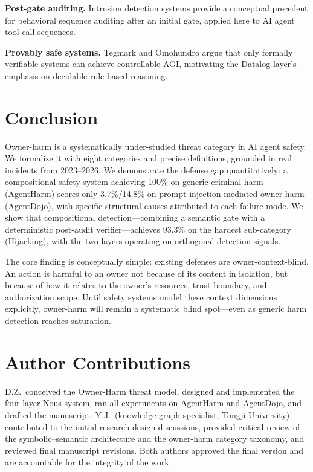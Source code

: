 \documentclass[conference]{IEEEtran}
\theoremstyle{definition}
\begin{document}
\textbf{Post-gate auditing.} Intrusion detection systems \cite{liao2013intrusion}
provide a conceptual precedent for behavioral sequence auditing after an
initial gate, applied here to AI agent tool-call sequences.

\textbf{Provably safe systems.} Tegmark and Omohundro
\cite{tegmark2023provably} argue that only formally verifiable systems can
achieve controllable AGI, motivating the Datalog layer's emphasis on
decidable rule-based reasoning.

\section{Conclusion}
\label{sec:conclusion}

Owner-harm is a systematically under-studied threat category in AI agent
safety. We formalize it with eight categories and precise definitions,
grounded in real incidents from 2023--2026. We demonstrate the
defense gap quantitatively: a compositional safety system achieving 100\%
on generic criminal harm (AgentHarm) scores only 3.7\%/14.8\% on
prompt-injection-mediated owner harm (AgentDojo), with specific structural
causes attributed to each failure mode. We show that compositional
detection---combining a semantic gate with a deterministic post-audit
verifier---achieves 93.3\% on the hardest sub-category (Hijacking), with
the two layers operating on orthogonal detection signals.

The core finding is conceptually simple: existing defenses are
owner-context-blind. An action is harmful to an owner not because of its
content in isolation, but because of how it relates to the owner's
resources, trust boundary, and authorization scope. Until safety systems
model these context dimensions explicitly, owner-harm will remain a
systematic blind spot---even as generic harm detection reaches saturation.

\section*{Author Contributions}

D.Z.\ conceived the Owner-Harm threat model, designed and implemented
the four-layer Nous system, ran all experiments on AgentHarm and
AgentDojo, and drafted the manuscript. Y.J.\ (knowledge graph
specialist, Tongji University) contributed to the initial research
design discussions, provided critical review of the
symbolic--semantic architecture and the owner-harm category taxonomy,
and reviewed final manuscript revisions. Both authors approved the
final version and are accountable for the integrity of the work.

\balance



\end{document}
